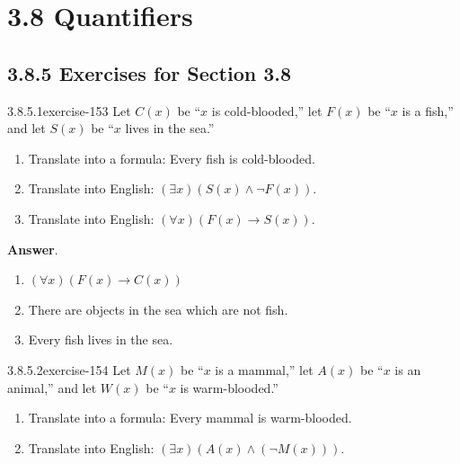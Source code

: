\documentclass[twoside,10pt,]{book}
\numberwithin{equation}{section}
\begin{document}
\section*{3.8 Quantifiers}
\subsection*{3.8.5 Exercises for Section 3.8}
\begin{divisionsolution}{3.8.5.1}{}{exercise-153}%
\hypertarget{p-1398}{}%
Let \(C(x)\) be ``\(x\) is cold-blooded,'' let \(F(x)\) be ``\(x\) is a fish,'' and let \(S(x)\) be ``\(x\) lives in the sea.''%
\par
\hypertarget{p-1399}{}%
\leavevmode%
\begin{enumerate}[label=(\alph*)]
\item\hypertarget{li-768}{}\hypertarget{p-1400}{}%
Translate into a formula: Every fish is cold-blooded.%
\item\hypertarget{li-769}{}\hypertarget{p-1401}{}%
Translate into English: \((\exists x)(S(x) \land  \neg F(x))\).%
\item\hypertarget{li-770}{}\hypertarget{p-1402}{}%
Translate into English: \((\forall x)(F(x) \rightarrow  S(x))\).%
\end{enumerate}
%
\par\smallskip%
\noindent\textbf{Answer}.\quad%
\hypertarget{p-1403}{}%
\leavevmode%
\begin{enumerate}[label=(\alph*)]
\item\hypertarget{li-771}{}\hypertarget{p-1404}{}%
\((\forall x)(F(x)\to C(x))\)%
\item\hypertarget{li-772}{}\hypertarget{p-1405}{}%
There are objects in the sea which are not fish.%
\item\hypertarget{li-773}{}\hypertarget{p-1406}{}%
Every fish lives in the sea.%
\end{enumerate}
%
\end{divisionsolution}%
\begin{divisionsolution}{3.8.5.2}{}{exercise-154}%
\hypertarget{p-1407}{}%
Let \(M(x)\) be ``\(x\) is a mammal,'' let \(A(x)\) be ``\(x\) is an animal,'' and let \(W(x)\) be ``\(x\) is warm-blooded.''%
\par
\hypertarget{p-1408}{}%
\leavevmode%
\begin{enumerate}[label=(\alph*)]
\item\hypertarget{li-774}{}\hypertarget{p-1409}{}%
Translate into a formula: Every mammal is warm-blooded.%
\item\hypertarget{li-775}{}\hypertarget{p-1410}{}%
Translate into English: \((\exists x)(A(x) \land  (\neg M(x)))\).%
\end{enumerate}
%
\end{divisionsolution}%
\end{document}
